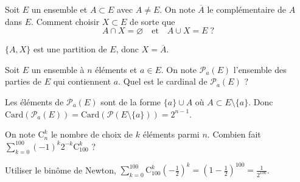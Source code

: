 \begin{question}

Soit $E$ un ensemble et $A\subset E$ avec $A\neq E$. On note $\overline{A}$ le complémentaire de $A$ dans $E$. Comment choisir $X\subset E$ de sorte que
$$A\cap X=\varnothing \quad \mbox{et}\quad A\cup X=E \; ?$$
\begin{answers}  
\end{answers}
\begin{explanations}
$\{A,X\}$ est une partition de $E$, donc $X=\overline{A}$.
\end{explanations}
\end{question}



\begin{question}

Soit $E$ un ensemble à $n$ éléments et $a\in E$. On note $\mathscr{P}_a(E)$ l'ensemble des parties de $E$ qui contiennent $a$. Quel est le cardinal de $\mathscr{P}_a(E)$ ?
\begin{answers}  
\end{answers}
\begin{explanations}
Les éléments de $\mathscr{P}_a(E)$ sont de la forme $\{a\}\cup A$ où $A\subset E\setminus \{a\}$. Donc $\mathrm{Card}(\mathscr{P}_a(E))=\mathrm{Card}(\mathscr{P}(E\setminus \{a\}))=2^{n-1}$.
\end{explanations}
\end{question}


\begin{question}

On note $\mathrm{C}^k_n$ le nombre de choix de $k$ éléments parmi $n$. Combien fait $\displaystyle \sum _{k=0}^{100}(-1)^k2^{-k}\mathrm{C}^k_{100}$ ?
\begin{answers}  
\end{answers}
\begin{explanations}
Utiliser le binôme de Newton, $\displaystyle \sum _{k=0}^{100}\mathrm{C}^k_{100}\left(-\frac{1}{2}\right)^k=\left(1-\frac{1}{2}\right)^{100}=\frac{1}{2^{100}}$.
\end{explanations}
\end{question}



